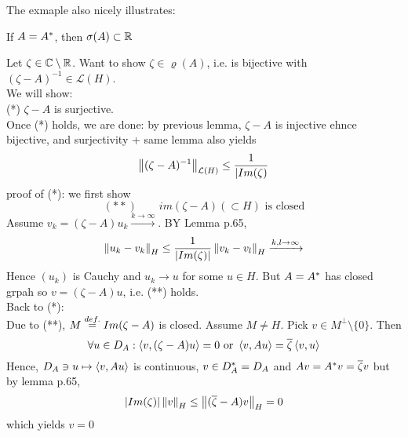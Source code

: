 The exmaple also nicely illustrates:
\begin{proposition}
	If $A={A}^*$, then $\sigma(A)\subset \mathbb{R}$
	\begin{pf}{}{}
		Let $\zeta\in\mathbb{C}\setminus\mathbb{R}$. Want to show $\zeta\in\varrho(A)$, i.e.  is bijective with $(\zeta-A)^{-1}\in\mathcal{L}(H)$.\\
		We will show:\\
		(*) $\zeta-A$ is surjective.\\
		Once  (*) holds, we are done: by previous lemma, $\zeta-A$ is injective ehnce bijective, and surjectivity + same lemma also yields
		$$
			\left\|{(\zeta-A)^{-1}}\right\|_{\mathcal{L}(H)}\leq\frac{1}{|Im(\zeta)}
		$$
		proof of (*): we first show
		$$
			(**)\qquad im(\zeta-A)(\subset H) \text{  is closed}
		$$
		Assume $v_k=(\zeta-A)u_k\xrightarrow{k\to\infty}$. BY Lemma p.65,
		$$
			\left\|{u_k-v_k}\right\|_H\leq\frac{1}{|Im(\zeta)|}\left\|{v_k-v_l}\right\|_H\xrightarrow{k,l\to\infty}$$Hence $(u_k)$ is Cauchy and $u_k\to u$ for some $u\in H$. But $A={A}^*$ has closed grpah so $v=(\zeta-A)u$, i.e. (**) holds.\\
		Back to (*):\\
		Due to (**), $M\stackrel{def.}{=} Im(\zeta-A)$ is closed. Assume $M\neq H$. Pick $v\in M^\perp\setminus\{0\}$. Then
		$$
			\forall u\in D_A:\left<{v},{(\zeta-A)u}\right>=0\text{  or  }\left<{v},{Au}\right>=\overline{\zeta}\left<{v},{u}\right>$$
		Hence,
		$
			D_A\ni u\mapsto \left<{v},{Au}\right>
		$
		is continuous, $v\in D_{A}^*=D_A$ and $Av={A}^*v=\overline{\zeta}v$
		but by lemma p.65,
		$$|Im(\zeta)|\left\|{v}\right\|_H\leq\left\|{(\overline{\zeta}-A)v}\right\|_H=0$$
		which yields $v=0 $
	\end{pf}
\end{proposition}

